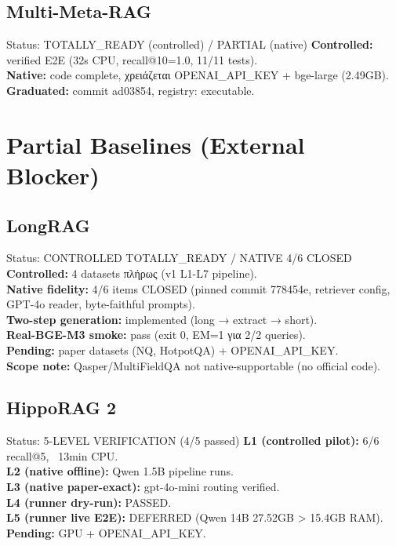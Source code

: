 \documentclass[11pt,a4paper]{article}
\begin{document}
\subsection{Multi-Meta-RAG}

\begin{okbox}{Status: TOTALLY\_READY (controlled) / PARTIAL (native)}
\textbf{Controlled:} verified E2E (32s CPU, recall@10=1.0, 11/11 tests). \\
\textbf{Native:} code complete, χρειάζεται OPENAI\_API\_KEY + bge-large (2.49GB). \\
\textbf{Graduated:} commit ad03854, registry: executable.
\end{okbox}

\section{Partial Baselines (External Blocker)}

\subsection{LongRAG}

\begin{statusbox}{Status: CONTROLLED TOTALLY\_READY / NATIVE 4/6 CLOSED}
\textbf{Controlled:} 4 datasets πλήρως (v1 L1-L7 pipeline). \\
\textbf{Native fidelity:} 4/6 items CLOSED (pinned commit 778454e, retriever config, GPT-4o reader, byte-faithful prompts). \\
\textbf{Two-step generation:} implemented (long → extract → short). \\
\textbf{Real-BGE-M3 smoke:} pass (exit 0, EM=1 για 2/2 queries). \\
\textbf{Pending:} paper datasets (NQ, HotpotQA) + OPENAI\_API\_KEY. \\
\textbf{Scope note:} Qasper/MultiFieldQA not native-supportable (no official code).
\end{statusbox}

\subsection{HippoRAG 2}

\begin{statusbox}{Status: 5-LEVEL VERIFICATION (4/5 passed)}
\textbf{L1 (controlled pilot):} 6/6 recall@5, ~13min CPU. \\
\textbf{L2 (native offline):} Qwen 1.5B pipeline runs. \\
\textbf{L3 (native paper-exact):} gpt-4o-mini routing verified. \\
\textbf{L4 (runner dry-run):} PASSED. \\
\textbf{L5 (runner live E2E):} DEFERRED (Qwen 14B 27.52GB > 15.4GB RAM). \\
\textbf{Pending:} GPU + OPENAI\_API\_KEY.
\end{statusbox}
\end{document}
